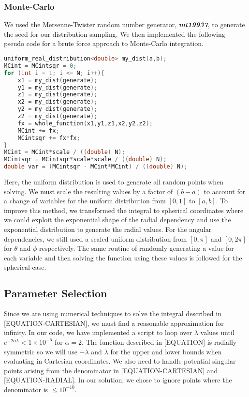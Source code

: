 \documentclass{emulateapj}
\begin{document}
\subsubsection{Monte-Carlo}
We used the Mersenne-Twister random number generator, \textbf{\textit{mt19937}}, to generate the seed for our distribution sampling. We then implemented the following pseudo code for a brute force approach to Monte-Carlo integration.
\begin{lstlisting}[language=c++]
uniform_real_distribution<double> my_dist(a,b);
MCint = MCintsqr = 0;
for (int i = 1; i <= N; i++){
    x1 = my_dist(generate);
    y1 = my_dist(generate);
    z1 = my_dist(generate);
    x2 = my_dist(generate);
    y2 = my_dist(generate);
    z2 = my_dist(generate);
    fx = whole_function(x1,y1,z1,x2,y2,z2);
    MCint += fx;
    MCintsqr += fx*fx;
}
MCint = MCint*scale / ((double) N);
MCintsqr = MCintsqr*scale*scale / ((double) N);
double var = (MCintsqr - MCint*MCint) / ((double) N);
\end{lstlisting}
Here, the uniform distribution is used to generate all random points when solving. We must scale the resulting values by a factor of $(b-a)$ to account for a change of variables for the uniform distribution from $[0,1]$ to $[a,b]$. To improve this method, we transformed the integral to spherical coordinates where we could exploit the exponential shape of the radial dependency and use the exponential distribution to generate the radial values. For the angular dependencies, we still used a scaled uniform distribution from $[0,\pi]$ and $[0,2\pi]$ for $\theta$ and $\phi$ respectively. The same routine of randomly generating a value for each variable and then solving the function using these values is followed for the spherical case.
\subsection{Parameter Selection}
\label{subsec:parameters}
Since we are using numerical techniques to solve the integral described in [EQUATION-CARTESIAN], we must find a reasonable approximation for infinity. In our code, we have implemented a script to loop over $\lambda$ values until $e^{-2\alpha\lambda} < 1\times10^{-5}$ for $\alpha = 2$. The function described in [EQUATION] is radially symmetric so we will use $-\lambda$ and $\lambda$ for the upper and lower bounds when evaluating in Cartesian coordinates. We also need to handle potential singular points arising from the denominator in [EQUATION-CARTESIAN] and [EQUATION-RADIAL]. In our solution, we chose to ignore points where the denominator is $\leq 10^{-10}$.
\end{document}
